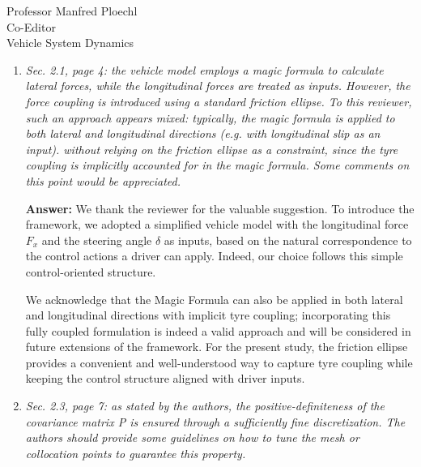 \documentclass{letter}
\begin{document}
\begin{letter}{Professor Manfred Ploechl\\
Co-Editor\\
Vehicle System Dynamics}
\begin{enumerate}
In further works we are actually planning to adopt more complex models and to parallelize the problem solution on multiple cores. This approach has been explored by our research group in previous works [...], where the nominal minumim lap-time problem was solved for a 14-DoF's multibody model. 

Finally, since the reviewer has pointed out this specific feature, we would like to remark that, although the out-of-plane dynamics is neglected in our model, we took into account longitudinal load transfers. 

\hrulefill

\item
\textit{Sec. 2.1, page 4: the vehicle model employs a magic formula to calculate lateral forces, while the longitudinal forces are treated as inputs. However, the force coupling is introduced using a standard friction ellipse. To this reviewer, such an approach appears mixed: typically, the magic formula is applied to both lateral and longitudinal directions (e.g. with longitudinal slip as an input). without relying on the friction ellipse as a constraint, since the tyre coupling is implicitly accounted for in the magic formula. Some comments on this point would be appreciated.}

\vspace{2mm}

\textbf{Answer:}
We thank the reviewer for the valuable suggestion. 
To introduce the framework, we adopted a simplified vehicle model with the longitudinal force $F_x$ and the steering angle $\delta$ as inputs, based on the natural correspondence to the control actions a driver can apply. Indeed, our choice follows this simple control-oriented structure. 

We acknowledge that the Magic Formula can also be applied in both lateral and longitudinal directions with implicit tyre coupling; incorporating this fully coupled formulation is indeed a valid approach and will be considered in future extensions of the framework. For the present study, the friction ellipse provides a convenient and well-understood way to capture tyre coupling while keeping the control structure aligned with driver inputs.


\hrulefill

\item
\textit{Sec. 2.3, page 7: as stated by the authors, the positive-definiteness of the covariance matrix P is ensured through a sufficiently fine discretization. The authors should provide some guidelines on how to tune the mesh or collocation points to guarantee this property.
}


\end{enumerate}
\end{letter}
\end{document}

